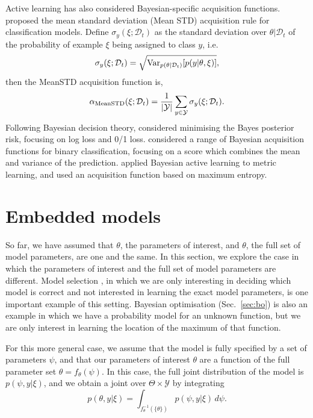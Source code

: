 \documentclass[a4paper, 10pt]{report}
\theoremstyle{plain}
\begin{document}
	Active learning has also considered Bayesian-specific acquisition functions.
	\citet{kendall2015bayesian} proposed the mean standard deviation (Mean STD) acquisition rule for classification models.
	Define $\sigma_y(\xi;\mathcal{D}_t)$ as the standard deviation over $\theta|\mathcal{D}_t$ of the probability of example $\xi$ being assigned to class $y$, i.e.~
	\begin{equation}
	\sigma_y(\xi;\mathcal{D}_t) = \sqrt{\mathrm{Var}_{p(\theta|\mathcal{D}_t)}[p(y|\theta,\xi)]},
	\end{equation}
	then the MeanSTD acquisition function is,
	\begin{equation}
	\alpha_\textup{MeanSTD}(\xi;\mathcal{D}_t) = \frac{1}{|\mathcal{Y}|}\sum_{y\in\mathcal{Y}} \sigma_y(\xi;\mathcal{D}_t).
	\end{equation}
	Following Bayesian decision theory, \citet{roy2001toward} considered minimising the Bayes posterior risk, focusing on log loss and 0/1 loss.  \citet{kapoor2007active} considered a range of Bayesian acquisition functions for binary classification, focusing on a score which combines the mean and variance of the prediction. \citet{yang2012bayesian} applied Bayesian active learning to metric learning, and used an acquisition function based on maximum entropy.
	
	
	
	
	\section{Embedded models}
	\label{sec:embedded}
	So far, we have assumed that $\theta$, the parameters of interest, and $\theta$, the full set of model parameters, are one and the same.
	In this section, we explore the case in which the parameters of interest and the full set of model parameters are different.
	Model selection \citep{vanlier2014optimal,drovandi2014sequential}, in which we are only interesting in deciding which model is correct and not interested in learning the exact model parameters, is one important example of this setting.
	Bayesian optimisation (Sec.~\ref{sec:bo}) is also an example in which we have a probability model for an unknown function, but we are only interest in learning the location of the maximum of that function.
	
	For this more general case, we assume that the model is fully specified by a set of parameters $\psi$, and that our parameters of interest $\theta$ are a function of the full parameter set $\theta=f_\theta(\psi)$. In this case, the full joint distribution of the model is $p(\psi,y|\xi)$, and we obtain a joint over $\Theta \times \mathcal{Y}$ by integrating 
	\begin{equation}
	p(\theta,y|\xi) = \int_{f_\theta^{-1}(\{\theta\})} p(\psi,y|\xi)\,d\psi.
	\end{equation}
	
\end{document}
